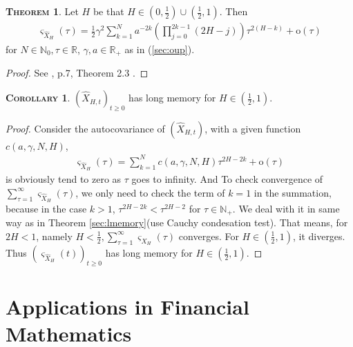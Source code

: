 \documentclass[a4paper, twoside, 11pt]{article}
\theoremstyle{definition}
\newtheorem{theorem}[definition]{\scshape Theorem}
\newtheorem{corollary}[definition]{\scshape Corollary}
\newcommand{\brkt}[1]{\left({#1} \right)}
\begin{document}
\begin{theorem}
  Let $H$ be that $H\in (0, \frac{1}{2}) \cup (\frac{1}{2}, 1)$. Then
  \begin{eqnarray*}
	\varsigma_{\hat{X}_{H}}(\tau) = \frac{1}{2} \gamma^2 \sum_{k=1}^{N} a^{-2k}\brkt{\prod_{j=0}^{2k-1}(2H-j)}\tau^{2(H-k)} + \mathrm{o}(\tau)
\end{eqnarray*}
for $N \in \mathbb{N}_{0}, \tau\in\mathbb{R}$, $\gamma, a \in \mathbb{R}_+$ as in (\ref{sec:oup}).
  \label{sec:autocov}
\end{theorem}
\begin{proof}
  See \cite{chriel}, p.7, Theorem 2.3 .
\end{proof}

\begin{corollary}
  $(\hat{X}_{H,t})_{t\ge 0}$ has long memory for $H\in (\frac{1}{2}, 1)$.
  \label{sec:longmer}
\end{corollary}
\begin{proof}
  Consider the autocovariance of $(\hat{X}_{H,t})$, with a given function $c(a, \gamma, N, H)$,
  \begin{eqnarray*}
	\varsigma_{\hat{X}_{H}}(\tau) = \sum_{k=1}^N c(a, \gamma, N, H) \tau^{2H-2k} + \mathrm{o}(\tau)
  \end{eqnarray*}
  is obviously tend to zero as $\tau$ goes to infinity. And To check convergence of $\sum_{\tau=1}^{\infty} \varsigma_{\hat{X}_{H}}(\tau)$, we only need to check the term of $k=1$ in the summation, because in the case $k>1$, $\tau^{2H-2k} < \tau^{2H-2}$ for $\tau\in\mathbb{N}_{+}$. We deal with it in same way as in Theorem \ref{sec:lmemory}(use Cauchy condesation test). That means, for $2H < 1$, namely $H<\frac{1}{2}, \sum_{\tau=1}^{\infty} \varsigma_{X_{H}}(\tau)$ converges. For $H\in (\frac{1}{2}, 1)$, it diverges. Thus $(\varsigma_{\hat{X}_{H}}(t))_{t\ge 0}$ has long memory for $H\in(\frac{1}{2}, 1)$.
\end{proof}
\newpage

\section{Applications in Financial Mathematics}
\setcounter{equation}{0}
\end{document}
